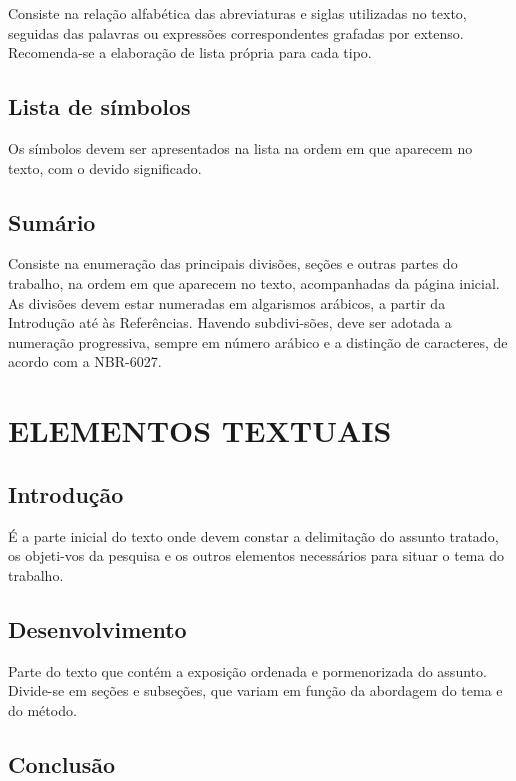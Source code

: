 Consiste na relação alfabética das abreviaturas e siglas
utilizadas no texto, seguidas das palavras ou expressões correspondentes grafadas por extenso. Recomenda-se a elaboração de lista própria para cada tipo.

\subsection{Lista de símbolos}

Os símbolos devem ser apresentados na lista na ordem em que
aparecem no texto, com o devido significado.

\subsection{Sumário}

Consiste na enumeração das principais divisões, seções e outras
partes do trabalho, na ordem em que aparecem no texto, acompanhadas da página inicial. As divisões devem estar numeradas em algarismos arábicos, a partir da Introdução até às Referências. Havendo subdivi-sões, deve ser adotada a numeração progressiva, sempre em número arábico e a distinção de caracteres, de acordo com a NBR-6027.

\section{ELEMENTOS TEXTUAIS}

\subsection{Introdução}

É a parte inicial do texto onde devem constar a delimitação do
assunto tratado, os objeti-vos da pesquisa e os outros elementos necessários para situar o tema do trabalho.

\subsection{Desenvolvimento}

Parte do texto que contém a exposição ordenada e pormenorizada do
assunto. Divide-se em seções e subseções, que variam em função da abordagem do tema e do método.

\subsection{Conclusão}

